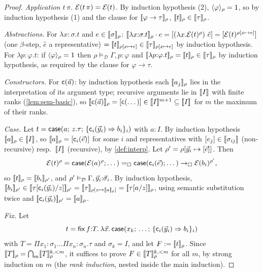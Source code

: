 \begin{proof}
\emph{Application $t\,\pi$.}  $\mathcal{E}(t\,\pi) = \mathcal{E}(t)$.  By induction
hypothesis (2), $\langle \varphi \rangle_{\rho} = 1$, so by induction hypothesis (1)
and the clause for $[\![ \varphi \to \tau ]\!]_{\rho}$, $[\![ t ]\!]_\rho \in
[\![ \tau ]\!]_{\rho}$.

\emph{Abstractions.}  For $\lambda x{:}\sigma.t$ and $e \in
[\![ \sigma ]\!]_{\rho}$: $[\![ \lambda x{:}\sigma.t ]\!]_\rho \cdot e =
[(\lambda x.\mathcal{E}(t)^{\rho})\ \hat{e}] = [\mathcal{E}(t)^{\rho[x
\mapsto e]}]$ (one $\beta$-step, $\hat e$ a representative) $=
[\![ t ]\!]_{\rho[x \mapsto e]} \in [\![ \tau ]\!]_{\rho[x \mapsto e]}$ by
induction hypothesis.  For $\lambda p{:}\varphi.t$: if
$\langle \varphi \rangle_{\rho} = 1$ then $\rho \vDash_{\mathcal{D}} \Gamma,
p{:}\varphi$ and $[\![ \lambda p{:}\varphi.t ]\!]_\rho = [\![ t ]\!]_\rho \in
[\![ \tau ]\!]_{\rho}$ by induction hypothesis, as required by the clause for
$\varphi \to \tau$.

\emph{Constructors.}  For $\mathsf{c}(\vec{a})$: by induction hypothesis
each $[\![ a_j ]\!]_\rho$ lies in the interpretation of its argument type;
recursive arguments lie in $[\![ I ]\!]_{}$ with finite ranks
(\cref{lem:sem-basic}), so $[\![ \mathsf{c}(\vec{a}) ]\!]_\rho =
[\mathsf{c}(\dots)] \in [\![ I ]\!]^{m+1} \subseteq [\![ I ]\!]_{}$ for $m$
the maximum of their ranks.

\emph{Case.}  Let $t = \mathsf{case}(a;\,z.\tau;\,\{\mathsf{c}_i(\vec{y}_i)
\Rightarrow b_i\}_i)$ with $a : I$.  By induction hypothesis $[\![ a ]\!]_\rho
\in [\![ I ]\!]_{}$, so $[\![ a ]\!]_\rho = [\mathsf{c}_i(\vec{e})]$ for some
$i$ and representatives with $[e_j] \in [\![ \sigma_{ij} ]\!]_{}$
(non-recursive) resp.\ $[\![ I ]\!]_{}$ (recursive), by
\cref{def:interp}.  Let $\rho' = \rho[\vec{y}_i \mapsto
[\vec{e}]]$.  Then
\[
  \mathcal{E}(t)^{\rho} = \mathsf{case}(\mathcal{E}(a)^{\rho}; \dots)
  =_{\square} \mathsf{case}(\mathsf{c}_i(\vec{e}); \dots)
  \rightarrow_{\square} \mathcal{E}(b_i)^{\rho'},
\]
so $[\![ t ]\!]_\rho = [\![ b_i ]\!]_{\rho'}$, and $\rho' \vDash_{\mathcal{D}}
\Gamma, \vec{y}_i{:}\vec{\sigma}_i$.  By induction hypothesis, $\sem{b_i}_{\rho'}
\in \semr{\subst{\tau}{\wcns{c}_i(\tup{y}_i)}{z}}{\rho'} =
\semr{\tau}{\rho[z \mapsto \sem{a}_\rho]} =
\semr{\subst{\tau}{a}{z}}{\rho}$, using semantic substitution twice and
$[\![ \mathsf{c}_i(\vec{y}_i) ]\!]_{\rho'} = [\![ a ]\!]_\rho$.

\emph{Fix.}  Let
\[
  t = \mathsf{fix}\,f{:}T.\,\lambda \vec{x}.\,
  \mathsf{case}(x_k;\,\dots;\,\{\mathsf{c}_i(\vec{y}_i) \Rightarrow b_i\}_i)
\]
with $T = \Pi x_1{:}\sigma_1 \dots \Pi x_n{:}\sigma_n.\tau$ and
$\sigma_k = I$, and let $F \mathrel{:=} [\![ t ]\!]_\rho$.  Since $[\![ T ]\!]_{\rho} = \bigcap_m
[\![ T ]\!]_{\rho}^{k,<m}$, it suffices to prove $F \in
[\![ T ]\!]_{\rho}^{k,<m}$ for all $m$, by strong induction on $m$ (the
\emph{rank induction}, nested inside the main induction).


\end{proof}
